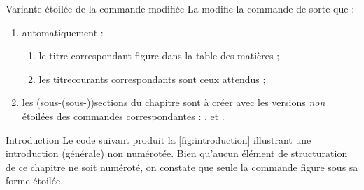 
\begin{dbremark}{Variante étoilée de la commande \protect{} modifiée}{}
  La \yatcl{} modifie la commande  de sorte que :
  \begin{enumerate}
  \item automatiquement :
    \begin{enumerate}
    \item le titre correspondant figure dans la table des matières ;
    \item les \glspl{titrecourant} correspondants sont ceux attendus ;
    \end{enumerate}
  \item les (sous-(sous-))sections du chapitre sont à créer avec les versions
    \emph{non} étoilées des commandes correspondantes : ,
     et .
  \end{enumerate}
\end{dbremark}

\begin{dbexample}{Introduction}{}
  Le code suivant produit la \vref{fig:introduction} illustrant une
  introduction (générale) non numérotée. Bien qu'aucun élément de structuration
  de ce chapitre ne soit numéroté, on constate que seule la commande
   figure sous sa forme étoilée.
\end{dbexample}

